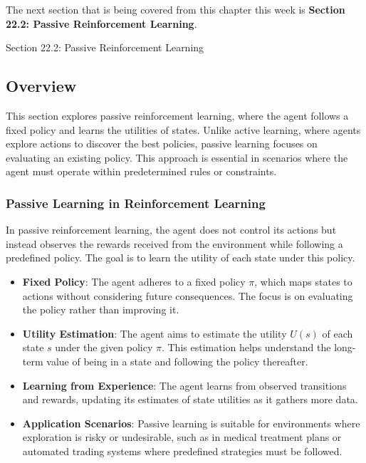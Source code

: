 The next section that is being covered from this chapter this week is \textbf{Section 22.2: Passive Reinforcement Learning}.

\begin{notes}{Section 22.2: Passive Reinforcement Learning}
    \subsection*{Overview}

    This section explores passive reinforcement learning, where the agent follows a fixed policy and learns the utilities of states. Unlike active learning, where agents explore actions to discover the best 
    policies, passive learning focuses on evaluating an existing policy. This approach is essential in scenarios where the agent must operate within predetermined rules or constraints.
    
    \subsubsection*{Passive Learning in Reinforcement Learning}
    
    In passive reinforcement learning, the agent does not control its actions but instead observes the rewards received from the environment while following a predefined policy. The goal is to learn the utility 
    of each state under this policy.
    
    \begin{highlight}
    
        \begin{itemize}
            \item \textbf{Fixed Policy}: The agent adheres to a fixed policy $\pi$, which maps states to actions without considering future consequences. The focus is on evaluating the policy rather than 
            improving it.
            \item \textbf{Utility Estimation}: The agent aims to estimate the utility $U(s)$ of each state $s$ under the given policy $\pi$. This estimation helps understand the long-term value of being 
            in a state and following the policy thereafter.
            \item \textbf{Learning from Experience}: The agent learns from observed transitions and rewards, updating its estimates of state utilities as it gathers more data.
            \item \textbf{Application Scenarios}: Passive learning is suitable for environments where exploration is risky or undesirable, such as in medical treatment plans or automated trading systems where 
            predefined strategies must be followed.
        \end{itemize}
    

\end{highlight}
\end{notes}
